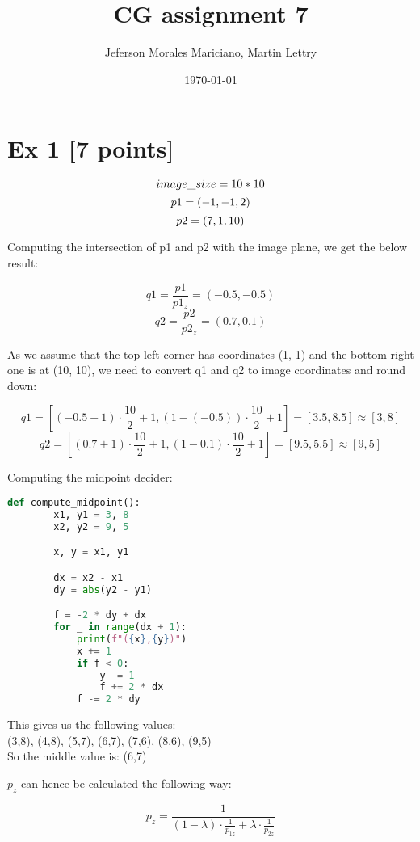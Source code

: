 \documentclass{article}
\title{CG assignment 7}
\author{Jeferson Morales Mariciano, Martin Lettry}
\date{\today}
\begin{document}
\maketitle

\section*{Ex 1 [7 points]}


\[
    image\_size = 10 * 10 \\
\]
\[
    p1 = (-1, -1, 2) \\
\]
\[
    p2 = (7, 1, 10) \\
\]

Computing the intersection of p1 and p2 with the image plane, we get the below result:

\[
    q1 = \frac{p1}{p1_z} = (-0.5, -0.5)
\]
\[
    q2 = \frac{p2}{p2_z} = (0.7, 0.1)
\]

As we assume that the top-left corner has coordinates (1, 1) and the bottom-right one is at (10, 10), we need to convert q1 and q2 to image coordinates and round down:

\[
    q1 = [(-0.5 + 1) \cdot \frac{10}{2} + 1, (1 - (-0.5)) \cdot \frac{10}{2} + 1] = [3.5, 8.5] \approx [3, 8]
\]
\[
    q2 = [(0.7 + 1) \cdot \frac{10}{2} + 1, (1 - 0.1) \cdot \frac{10}{2} + 1]
    = [9.5, 5.5] \approx [9, 5]
\]


Computing the midpoint decider:

\begin{lstlisting}[language=Python]
    def compute_midpoint():
        x1, y1 = 3, 8
        x2, y2 = 9, 5

        x, y = x1, y1

        dx = x2 - x1
        dy = abs(y2 - y1)

        f = -2 * dy + dx
        for _ in range(dx + 1):
            print(f"({x},{y})")
            x += 1
            if f < 0:
                y -= 1
                f += 2 * dx
            f -= 2 * dy
\end{lstlisting}


This gives us the following values: \\

(3,8), (4,8), (5,7), (6,7), (7,6), (8,6), (9,5) \\

So the middle value is: (6,7)

$p_z$ can hence be calculated the following way:

\[
    p_z = \frac{1}{(1 - \lambda) \cdot \frac{1}{p_{1z}} + \lambda \cdot \frac{1}{p_{2z}}}
\]
\end{document}
